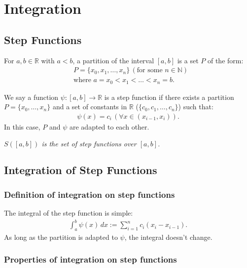 \documentclass[a4paper, 12pt, twoside]{article}
\begin{document}
\section{Integration}

\subsection{Step Functions}

For $a, b \in \mathbb{R}$ with $a < b$, a partition of the interval
$[a,b]$ is a set $P$ of the form:
\begin{align*}
       & P = \{x_0, x_1, \ldots, x_n\} \, (\text{for some } n \in \mathbb{N}) \\
       & \text{where } a = x_0 < x_1 < \ldots < x_n = b.
\end{align*}

We say a function $\psi:[a,b]\to\mathbb{R}$ is a step function if
there exists a partition $P = \{x_0, \ldots, x_n\}$ and a set of constants in
$\mathbb{R}$ ($\{c_0, c_1, \ldots, c_n\}$) such that:
\begin{align*}
      \psi(x) = c_i \, (\forall x \in (x_{i-1}, x_i)).
\end{align*}
In this case, $P$ and $\psi$ are adapted to each other.

\vspace{\baselineskip}

\textit{$S([a, b])$ is the set of step functions over $[a, b]$.}

\subsection{Integration of Step Functions}

\subsubsection{Definition of integration on step functions}

The integral of the step function is simple:
\begin{align*}
      \int_a^b \psi(x) \, dx := \sum_{i = 1}^n c_i(x_i - x_{i-1}).
\end{align*}
As long as the partition is adapted to $\psi$, the integral doesn't
change.

\subsubsection{Properties of integration on step functions}
\end{document}
